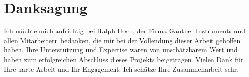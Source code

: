 \chapter*{Danksagung}

Ich möchte mich aufrichtig bei Ralph Hoch, der Firma Gantner Instruments und allen Mitarbeitern bedanken, die mir bei der Vollendung dieser Arbeit geholfen haben. Ihre Unterstützung und Expertise waren von unschätzbarem Wert und haben zum erfolgreichen Abschluss dieses Projekts beigetragen. Vielen Dank für Ihre harte Arbeit und Ihr Engagement. Ich schätze Ihre Zusammenarbeit sehr.

\clearpage